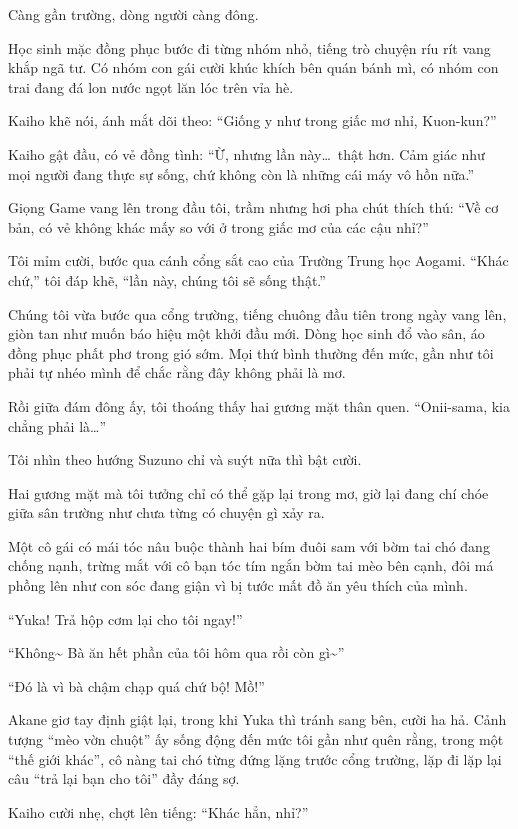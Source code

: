 \documentclass[../main.tex]{subfiles}
\begin{document}
Càng gần trường, dòng người càng đông.

Học sinh mặc đồng phục bước đi từng nhóm nhỏ, tiếng trò chuyện ríu rít vang khắp ngã tư. Có nhóm con gái cười khúc khích bên quán bánh mì, có nhóm con trai đang đá lon nước ngọt lăn lóc trên vỉa hè.

Kaiho khẽ nói, ánh mắt dõi theo: ``Giống y như trong giấc mơ nhỉ, Kuon-kun?''

Kaiho gật đầu, có vẻ đồng tình: ``Ừ, nhưng lần này\dots\ thật hơn. Cảm giác như mọi người đang thực sự sống, chứ không còn là những cái máy vô hồn nữa.''

Giọng Game vang lên trong đầu tôi, trầm nhưng hơi pha chút thích thú: ``Về cơ bản, có vẻ không khác mấy so với ở trong giấc mơ của các cậu nhỉ?''

Tôi mỉm cười, bước qua cánh cổng sắt cao của Trường Trung học Aogami. ``Khác chứ,'' tôi đáp khẽ, ``lần này, chúng tôi sẽ sống thật.''

Chúng tôi vừa bước qua cổng trường, tiếng chuông đầu tiên trong ngày vang lên, giòn tan như muốn báo hiệu một khởi đầu mới. Dòng học sinh đổ vào sân, áo đồng phục phất phơ trong gió sớm. Mọi thứ bình thường đến mức, gần như tôi phải tự nhéo mình để chắc rằng đây không phải là mơ.

Rồi giữa đám đông ấy, tôi thoáng thấy hai gương mặt thân quen. ``Onii-sama, kia chẳng phải là\dots''

Tôi nhìn theo hướng Suzuno chỉ và suýt nữa thì bật cười.

Hai gương mặt mà tôi tưởng chỉ có thể gặp lại trong mơ, giờ lại đang chí chóe giữa sân trường như chưa từng có chuyện gì xảy ra.

Một cô gái có mái tóc nâu buộc thành hai bím đuôi sam với bờm tai chó đang chống nạnh, trừng mắt với cô bạn tóc tím ngắn bờm tai mèo bên cạnh, đôi má phồng lên như con sóc đang giận vì bị tước mất đồ ăn yêu thích của mình.

``Yuka! Trả hộp cơm lại cho tôi ngay!''

``Không\~{} Bà ăn hết phần của tôi hôm qua rồi còn gì\~{}''

``Đó là vì bà chậm chạp quá chứ bộ! Mồ!''

Akane giơ tay định giật lại, trong khi Yuka thì tránh sang bên, cười ha hả. Cảnh tượng ``mèo vờn chuột'' ấy sống động đến mức tôi gần như quên rằng, trong một ``thế giới khác'', cô nàng tai chó từng đứng lặng trước cổng trường, lặp đi lặp lại câu ``trả lại bạn cho tôi'' đầy đáng sợ.

Kaiho cười nhẹ, chợt lên tiếng: ``Khác hẳn, nhỉ?''
\end{document}
